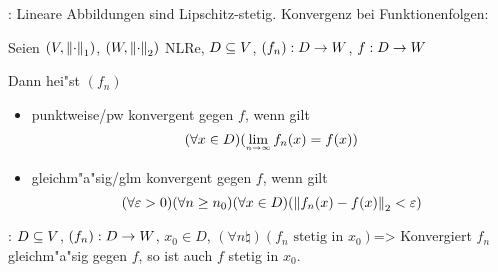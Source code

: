 \remark:{
  Lineare Abbildungen sind Lipschitz-stetig.
  }
\lesserdefinition Konvergenz bei Funktionenfolgen:{
  Seien $(V,{\left\| \cdot\right\|}_1)$, $(W,{\left\| \cdot\right\|}_2)$ NLRe, $D\subseteq V$,
  $(f_n):D\to W$, $f:D\to W$
  
  Dann hei"st $(f_n)$
  \begin{itemize}
    \item punktweise/pw konvergent gegen $f$, wenn gilt 
      \[(\forall x\in D)(\limn f_n(x)=f(x))
        \]
    \item gleichm"a"sig/glm konvergent gegen $f$, wenn gilt
      \[(\forall \varepsilon>0)(\forall n\geq n_0)(\forall x\in D)({\left\| f_n(x)-f(x)\right\|}_2<\varepsilon) 
        \]
    \end{itemize}
  }
\theorem: $D\subseteq V$, $(f_n):D\to W$, $x_0\in D$,
  $(\forall n\natural)(f_n \text{ stetig in $x_0$})$=>{
  Konvergiert $f_n$ gleichm"a"sig gegen $f$, so ist auch $f$ stetig in $x_0$.
  }  

